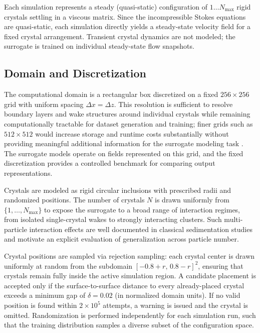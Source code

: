 Each simulation represents a steady (quasi-static) configuration of $1\ldots N_{\max}$ rigid crystals settling in a viscous matrix. Since the incompressible Stokes equations are quasi-static, each simulation directly yields a steady-state velocity field for a fixed crystal arrangement. Transient crystal dynamics are not modeled; the surrogate is trained on individual steady-state flow snapshots.
\newpage
\subsection{Domain and Discretization}

The computational domain is a rectangular box discretized on a fixed $256\times256$ grid with uniform spacing $\Delta x=\Delta z$. This resolution is sufficient to resolve boundary layers and wake structures around individual crystals while remaining computationally tractable for dataset generation and training; finer grids such as $512\times512$ would increase storage and runtime costs substantially without providing meaningful additional information for the surrogate modeling task \parencite{guo_convolutional_2016,thuerey_deep_2020}. The surrogate models operate on fields represented on this grid, and the fixed discretization provides a controlled benchmark for comparing output representations.

Crystals are modeled as rigid circular inclusions with prescribed radii and randomized positions. The number of crystals $N$ is drawn uniformly from $\{1,\ldots,N_{\max}\}$ to expose the surrogate to a broad range of interaction regimes, from isolated single-crystal wakes to strongly interacting clusters. Such multi-particle interaction effects are well documented in classical sedimentation studies \parencite{ladd_numerical_nodate} and motivate an explicit evaluation of generalization across particle number.

Crystal positions are sampled via rejection sampling: each crystal center is drawn uniformly at random from the subdomain $[-0.8+r,\, 0.8-r]^2$, ensuring that crystals remain fully inside the active simulation region. A candidate placement is accepted only if the surface-to-surface distance to every already-placed crystal exceeds a minimum gap of $\delta = 0.02$ (in normalized domain units). If no valid position is found within $2\times10^5$ attempts, a warning is issued and the crystal is omitted. Randomization is performed independently for each simulation run, such that the training distribution samples a diverse subset of the configuration space.

